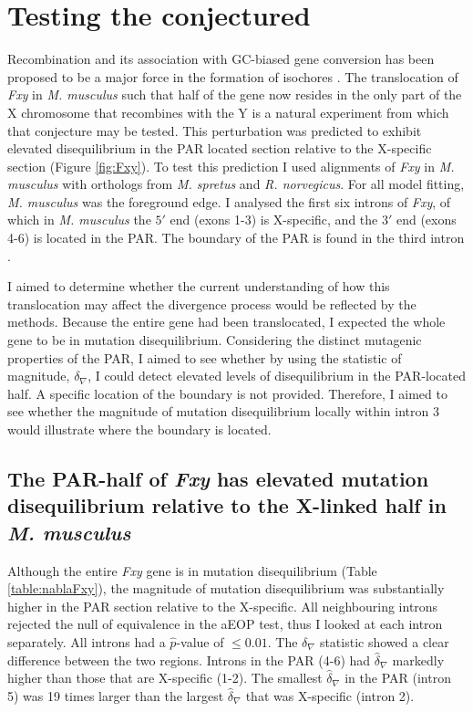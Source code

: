 

\section{Testing the conjectured}

Recombination and its association with GC-biased gene conversion has been proposed to be a major force in the formation of isochores \citep{Montoya-Burgos2003RecombinationGenomes}. The translocation of \textit{Fxy} in \textit{M. musculus} such that half of the gene now resides in the only part of the X chromosome that recombines with the Y is a natural experiment from which that conjecture may be tested. This perturbation was predicted to exhibit elevated disequilibrium in the PAR located section relative to the X-specific section (Figure \ref{fig:Fxy}). To test this prediction I used alignments of \textit{Fxy} in \textit{M. musculus} with orthologs from \textit{M. spretus} and \textit{R. norvegicus}. For all model fitting, \textit{M. musculus} was the foreground edge. I analysed the first six introns of \textit{Fxy}, of which in \textit{M. musculus} the $5'$ end (exons 1-3) is X-specific, and the $3'$ end (exons 4-6) is located in the PAR. The boundary of the PAR is found in the third intron \citep{Palmer1997AMice}. 

I aimed to determine whether the current understanding of how this translocation may affect the divergence process would be reflected by the methods. Because the entire gene had been translocated, I expected the whole gene to be in mutation disequilibrium. Considering the distinct mutagenic properties of the PAR, I aimed to see whether by using the statistic of magnitude, $\delta_\nabla$, I could detect elevated levels of disequilibrium in the PAR-located half. A specific location of the boundary is not provided. Therefore, I aimed to see whether the magnitude of mutation disequilibrium locally within intron 3 would illustrate where the boundary is located. 

\subsection{The PAR-half of \textit{Fxy} has elevated mutation disequilibrium relative to the X-linked half in \textit{M. musculus}}
\label{Fxy_TOE}

Although the entire \textit{Fxy} gene is in mutation disequilibrium (Table \ref{table:nablaFxy}), the magnitude of mutation disequilibrium was substantially higher in the PAR section relative to the X-specific. All neighbouring introns rejected the null of equivalence in the aEOP test, thus I looked at each intron separately. All introns had a $\hat p$-value of $\leq 0.01$. The $\delta_\nabla$ statistic showed a clear difference between the two regions. Introns in the PAR (4-6) had $\hat\delta_\nabla$ markedly higher than those that are X-specific (1-2). The smallest $\hat \delta_\nabla$ in the PAR (intron 5) was 19 times larger than the largest $\hat \delta_\nabla$ that was X-specific (intron 2).

